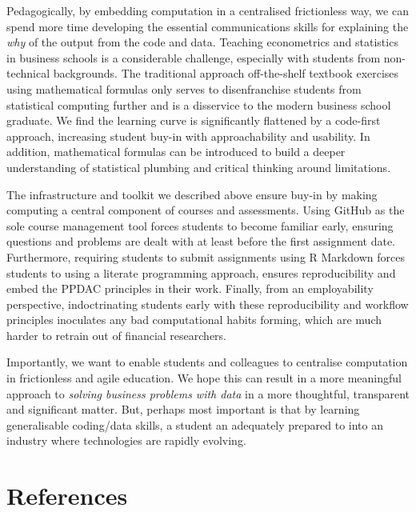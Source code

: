 \documentclass{article}
\begin{document}
Pedagogically, by embedding computation in a centralised frictionless
way, we can spend more time developing the essential communications
skills for explaining the \emph{why} of the output from the code and
data. Teaching econometrics and statistics in business schools is a
considerable challenge, especially with students from non-technical
backgrounds. The traditional approach off-the-shelf textbook exercises
using mathematical formulas only serves to disenfranchise students from
statistical computing further and is a disservice to the modern business
school graduate. We find the learning curve is significantly flattened
by a code-first approach, increasing student buy-in with approachability
and usability. In addition, mathematical formulas can be introduced to
build a deeper understanding of statistical plumbing and critical
thinking around limitations.

The infrastructure and toolkit we described above ensure buy-in by
making computing a central component of courses and assessments. Using
GitHub as the sole course management tool forces students to become
familiar early, ensuring questions and problems are dealt with at least
before the first assignment date. Furthermore, requiring students to
submit assignments using R Markdown forces students to using a literate
programming approach, ensures reproducibility and embed the PPDAC
principles in their work. Finally, from an employability perspective,
indoctrinating students early with these reproducibility and workflow
principles inoculates any bad computational habits forming, which are
much harder to retrain out of financial researchers.

Importantly, we want to enable students and colleagues to centralise
computation in frictionless and agile education. We hope this can result
in a more meaningful approach to \emph{solving business problems with
data} in a more thoughtful, transparent and significant matter. But,
perhaps most important is that by learning generalisable coding/data
skills, a student an adequately prepared to into an industry where
technologies are rapidly evolving.

\hypertarget{references}{%
\section*{References}\label{references}}
\end{document}
